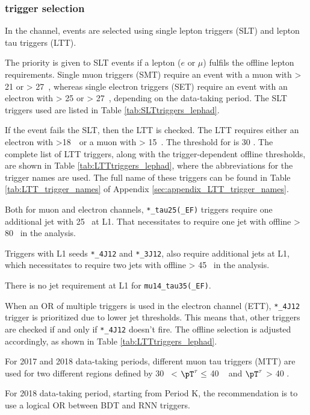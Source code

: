 \subsubsection{\lephad trigger selection}
\label{sec:lephadtrigger}
In the \lephad channel, events are selected using single lepton triggers (SLT) and lepton tau triggers (LTT). 

The priority is given to SLT events if a lepton ($e$ or $\mu$) fulfils the offline lepton \pT requirements.
Single muon triggers (SMT) require an event with a muon with \pT > 21 or > 27~\GeV, whereas single electron triggers (SET)
require an event with an electron with \pT > 25 or > 27~\GeV, depending on the data-taking period.
The SLT triggers used are listed in Table \ref{tab:SLTtriggers_lephad}. 

If the event fails the SLT, then the LTT is checked. The LTT requires either an electron with \pT >18~\GeV~or a
muon with \pT > 15~\GeV. The \pT threshold for \tauhad is 30 \GeV. The complete list of LTT triggers, along with the trigger-dependent offline \pT thresholds, are
shown in Table \ref{tab:LTTtriggers_lephad}, where the abbreviations for the trigger names are used.
The full name of these triggers can be found in Table \ref{tab:LTT_trigger_names} of Appendix \ref{sec:appendix_LTT_trigger_names}.

Both for muon and electron channels, \verb|*_tau25(_EF)| triggers require one additional jet with 25 \GeV\ at L1. 
That necessitates to require one jet with offline \pT > 80 \GeV~in the analysis.

Triggers with L1 seeds \verb|*_4J12| and \verb|*_3J12|, also require additional jets at L1,
which necessitates to require two jets with offline \pT > 45 \GeV~in the analysis.

There is no jet requirement at L1 for \verb|mu14_tau35(_EF)|. 

When an OR of multiple triggers is used in the electron channel (ETT), \verb|*_4J12| trigger is prioritized due to lower jet \pT thresholds. 
This means that, other triggers are checked if and only if  \verb|*_4J12| doesn't fire. The offline selection is adjusted accordingly, as shown in Table \ref{tab:LTTtriggers_lephad}.

For 2017 and 2018 data-taking periods, different muon tau triggers (MTT)
are used for two different regions defined by 30 \GeV~< $\pT^{\tau} \leq$ 40 \GeV~ and $\pT^{\tau}$ > 40 \GeV. 

For 2018 data-taking period, starting from Period K, the recommendation is to use a logical OR between 
BDT and RNN triggers.

